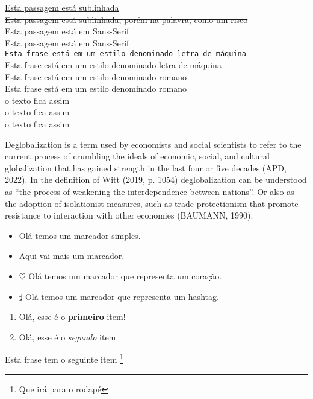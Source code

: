 \documentclass[12pt, a4paper, oneside]{book}
\begin{document}
\noindent
\underline {Esta passagem está sublinhada}\\
\sout {Esta passagem está sublinhada, porém na palavra, como um risco}\\

\noindent
\textsf{Esta passagem está em Sans-Serif}\\
{\sffamily Esta passagem está em Sans-Serif}\\

\noindent
\texttt{Esta frase está em um estilo denominado letra de máquina}\\
{\ttfamily Esta frase está em um estilo denominado letra de máquina}\\

\textrm{Esta frase está em um estilo denominado romano}\\
{\rmfamily Esta frase está em um estilo denominado romano}\\

\noindent
\small {o texto fica assim}\\
\large{o texto fica assim}\\
\Huge {o texto fica assim}\\

\begin{small} %

Deglobalization is a term used by economists and social scientists to refer to the current process of crumbling the ideals of economic, social, and cultural globalization that has gained strength in the last four or five decades (APD, 2022). In the definition of Witt (2019, p. 1054) deglobalization can be understood as “the process of weakening the interdependence between nations”. Or also as the adoption of isolationist measures, such as trade protectionism that promote resistance to interaction with other economies (BAUMANN, 1990).
\end{small}

\begin{footnotesize}%

\begin {itemize} 
\item Olá temos um marcador simples.
\item Aqui vai mais um marcador.
\end {itemize}

\begin {itemize}
\item [$\heartsuit$] Olá temos um marcador que representa um coração.
\item [$\sharp$] Olá temos um marcador que representa um hashtag.
\end {itemize}

\begin {enumerate}
\item Olá, esse é o \textbf{primeiro} item!
\item Olá, esse é o \textit{segundo} item
\end {enumerate}
Esta frase tem o seguinte item \footnote{Que irá para o rodapé}

\end{footnotesize}
\end{document}
